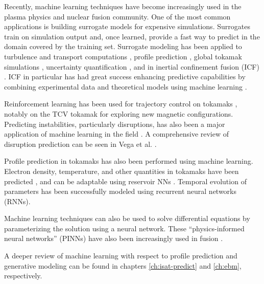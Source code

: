 Recently, machine learning techniques have become increasingly used in the plasma physics and nuclear fusion community. 
One of the most common applications is building surrogate models for expensive simulations. Surrogates train on simulation output and, once learned, provide a fast way to predict in the domain covered by the training set. Surrogate modeling \cite{taylor_how_2021} has been applied to turbulence and transport computations \cite{meneghini_neural-network_nodate,li_surrogate_2025,fransson_fast_2023,ho_neural_2021}, profile prediction \cite{morosohk_realtime_2023}, global tokamak simulations \cite{dong_deep_2021}, uncertainty quantification \cite{yudin_uncertainty_2024}, and in inertial confinement fusion (ICF) \cite{nora_ensemble_2017, anirudh_improved_2019}. ICF in particular has had great success enhancing predictive capabilities by combining experimental data and theoretical models using machine learning    \cite{gaffney_making_2019, humbird_cognitive_2021, gopalaswamy_tripled_2019}.

Reinforcement learning has been used for trajectory control on tokamaks \cite{seo_feedforward_2021, seo_development_2022, seo_avoiding_2024}, notably on the TCV tokamak \cite{degrave_magnetic_2022,tracey_towards_2024} for exploring new magnetic configurations. Predicting instabilities, particularly disruptions, has also been a major application of machine learning in the field \cite{rea_real-time_2019, kates-harbeck_predicting_2019, pau_machine_2019,fu_machine_2020, murari_investigating_2020, rea_progress_2020, rossi_hybrid_2024}. A comprehensive review of disruption prediction can be seen in Vega et al. \cite{vega_disruption_2022}. 

Profile prediction in tokamaks has also been performed using machine learning. Electron density, temperature, and other quantities in tokamaks have been predicted \cite{abbate_data-driven_2021, dong_machine_2021}, and can be adaptable using reservoir NNs  \cite{jalalvand_real-time_2022}. Temporal evolution of parameters has been successfully modeled using recurrent neural networks (RNNs)\cite{char_full_2024, wan_east_2022, seo_feedforward_2021, seo_development_2022}.

Machine learning techniques can also be used to solve differential equations by parameterizing the solution using a neural network. These ``physics-informed neural networks'' (PINNs) have also been increasingly used in fusion \cite{rossi_potential_2023, aymerich_physics_2023, seo_leveraging_2024}.

A deeper review of machine learning with respect to profile prediction and generative modeling can be found in chapters \ref{ch:isat-predict} and \ref{ch:ebm}, respectively.

